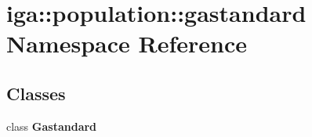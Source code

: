 \section{iga::population::gastandard Namespace Reference}
\label{namespaceiga_1_1population_1_1gastandard}


\subsection*{Classes}
\begin{CompactItemize}
\item 
class {\bf Gastandard}
\end{CompactItemize}
